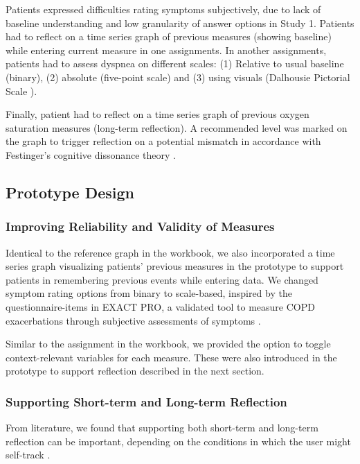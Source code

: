 Patients expressed difficulties rating symptoms subjectively, due to lack of baseline understanding and low granularity of answer options in Study 1. Patients had to reflect on a time series graph of previous measures (showing baseline) while entering current measure in one assignments. In another assignments, patients had to assess dyspnea on different scales: (1) Relative to usual baseline (binary), (2) absolute (five-point scale) and (3) using visuals (Dalhousie Pictorial Scale \cite{dalhousie}).  

Finally, patient had to reflect on a time series graph of previous oxygen saturation measures (long-term reflection). A recommended level was marked on the graph to trigger reflection on a potential mismatch in accordance with Festinger’s cognitive dissonance theory \cite{Rivera}. 

\subsection{Prototype Design}
\subsubsection{Improving Reliability and Validity of Measures}
Identical to the reference graph in the workbook, we also incorporated a time series graph visualizing patients’ previous measures in the prototype to support patients in remembering previous events while entering data. We changed symptom rating options from binary to scale-based, inspired by the questionnaire-items in EXACT PRO, a validated tool to measure COPD exacerbations through subjective assessments of symptoms \cite{exact}. 

Similar to the assignment in the workbook, we provided the option to toggle context-relevant variables for each measure. These were also introduced in the prototype to support reflection described in the next section. 

\subsubsection{Supporting Short-term and Long-term Reflection}
From literature, we found that supporting both short-term and long-term reflection can be important, depending on the conditions in which the user might self-track \cite{Li2010, Muller}. 

